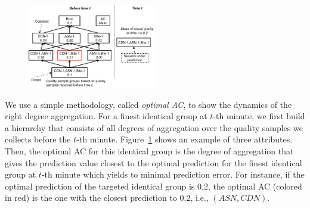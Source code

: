 \begin{figure}[h!]
\centering
 \includegraphics[width=0.5\textwidth] {figures/fig-optimal-AC.pdf}
\label{fig:example-optimal-ac}
\end{figure}

We use a simple methodology, called {\it optimal AC}, to show the dynamics of the right degree aggregation. For a finest identical group at $t$-th minute, we first build a hierarchy that consists of all degrees of aggregation over the quality samples we collects before the $t$-th minute. Figure~\ref{fig:example-optimal-ac} shows an example of three attributes. 
Then, the optimal AC for this identical group is the degree of aggregation that gives the prediction value closest to the optimal prediction for the finest identical group at $t$-th minute which yields to minimal prediction error.
For instance, if the optimal prediction of the targeted identical group is 0.2, the optimal AC (colored in red) is the one with the closest prediction to 0.2, i.e., $(ASN, CDN)$. 



